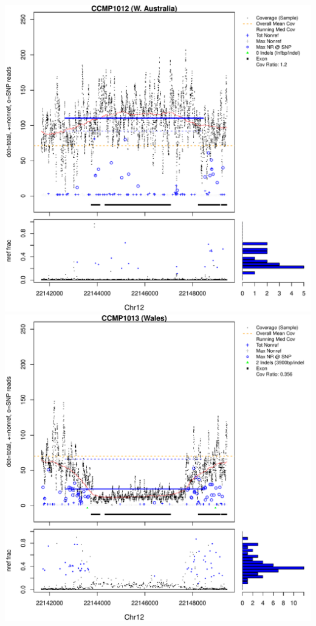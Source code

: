 \documentclass{article}\usepackage[]{graphicx}\usepackage[]{color}
\makeatletter
\def\maxwidth{ %
  \ifdim\Gin@nat@width>\linewidth
    \linewidth
  \else
    \Gin@nat@width
  \fi
}
\newenvironment{knitrout}{}{} %
\makeatother
\begin{document}
\begin{knitrout}
{\includegraphics[width=\maxwidth]{figs-knitr/unnamed-chunk-56-3} 
\includegraphics[width=\maxwidth]{figs-knitr/unnamed-chunk-56-4} 
}
\end{knitrout}
\end{document}
